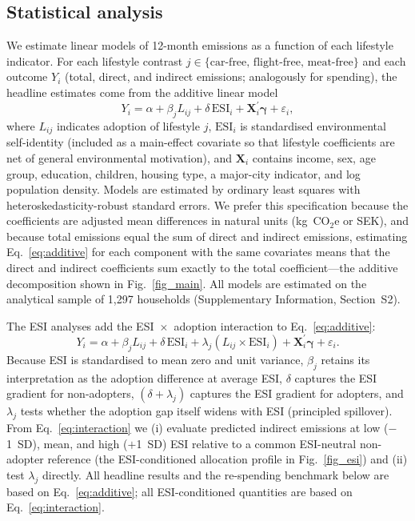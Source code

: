\documentclass[sn-nature]{sn-jnl}
\begin{document}
\subsection{Statistical analysis}
We estimate linear models of 12-month emissions as a function of each lifestyle indicator. For each lifestyle contrast $j \in \{\text{car-free, flight-free, meat-free}\}$ and each outcome $Y_i$ (total, direct, and indirect emissions; analogously for spending), the headline estimates come from the additive linear model
\begin{equation}\label{eq:additive}
Y_i = \alpha + \beta_j L_{ij} + \delta\,\mathrm{ESI}_i + \mathbf{X}_i^{\prime}\boldsymbol{\gamma} + \varepsilon_i,
\end{equation}
where $L_{ij}$ indicates adoption of lifestyle $j$, $\mathrm{ESI}_i$ is standardised environmental self-identity (included as a main-effect covariate so that lifestyle coefficients are net of general environmental motivation), and $\mathbf{X}_i$ contains income, sex, age group, education, children, housing type, a major-city indicator, and log population density. Models are estimated by ordinary least squares with heteroskedasticity-robust standard errors. We prefer this specification because the coefficients are adjusted mean differences in natural units (kg~CO$_2$e or SEK), and because total emissions equal the sum of direct and indirect emissions, estimating Eq.~\eqref{eq:additive} for each component with the same covariates means that the direct and indirect coefficients sum exactly to the total coefficient---the additive decomposition shown in Fig.~\ref{fig_main}. All models are estimated on the analytical sample of 1{,}297 households (Supplementary Information, Section~S2).

The ESI analyses add the ESI~$\times$~adoption interaction to Eq.~\eqref{eq:additive}:
\begin{equation}\label{eq:interaction}
Y_i = \alpha + \beta_j L_{ij} + \delta\,\mathrm{ESI}_i + \lambda_j \left(L_{ij} \times \mathrm{ESI}_i\right) + \mathbf{X}_i^{\prime}\boldsymbol{\gamma} + \varepsilon_i.
\end{equation}
Because ESI is standardised to mean zero and unit variance, $\beta_j$ retains its interpretation as the adoption difference at average ESI, $\delta$ captures the ESI gradient for non-adopters, $(\delta+\lambda_j)$ captures the ESI gradient for adopters,  and $\lambda_j$ tests whether the adoption gap itself widens with ESI (principled spillover). From Eq.~\eqref{eq:interaction} we (i) evaluate predicted indirect emissions at low ($-$1~SD), mean, and high ($+$1~SD) ESI relative to a common ESI-neutral non-adopter reference (the ESI-conditioned allocation profile in Fig.~\ref{fig_esi}) and (ii) test $\lambda_j$ directly. All headline results and the re-spending benchmark below are based on Eq.~\eqref{eq:additive}; all ESI-conditioned quantities are based on Eq.~\eqref{eq:interaction}.
\end{document}
